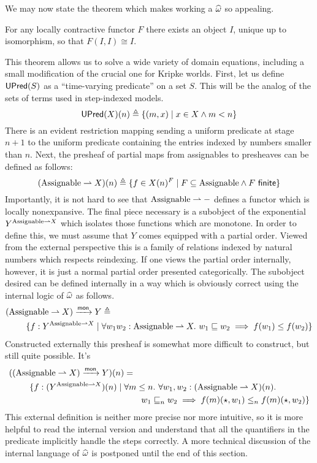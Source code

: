 We may now state the theorem which makes working a
$\widehat{\omega}$ so appealing.
\begin{thm}\label{thm:steps:fixed-points}
  For any locally contractive functor $F$ there exists an object $I$,
  unique up to isomorphism, so that $F(I, I) \cong I$.
\end{thm}
This theorem allows us to solve a wide variety of domain equations,
including a small modification of the crucial one for Kripke
worlds. First, let us define $\mathsf{UPred}(S)$ as a ``time-varying
predicate'' on a set $S$. This will be the analog of the sets of terms
used in step-indexed models.
\[
  \mathsf{UPred}(X)(n) \triangleq \{(m, x) \mid x \in X \land m < n\}
\]
There is an evident restriction mapping sending a uniform predicate at
stage $n + 1$ to the uniform predicate containing the entries indexed
by numbers smaller than $n$. Next, the presheaf of partial maps from
assignables to presheaves can be defined as follows:
\[
  (\assignables \pto X)(n) \triangleq
  \{f \in X(n)^{F} \mid F \subseteq \assignables \land F\ \mathsf{finite}\}
\]
Importantly, it is not hard to see that $\mathrm{Assignable} \rightharpoonup -$ defines
a functor which is locally nonexpansive. The final piece necessary is
a subobject of the exponential $Y^{\mathrm{Assignable} \rightharpoonup X}$ which
isolates those functions which are monotone. In order to define this,
we must assume that $Y$ comes equipped with a partial order. Viewed
from the external perspective this is a family of relations indexed by
natural numbers which respects reindexing. If one views the partial
order internally, however, it is just a normal partial order presented
categorically. The subobject desired can be defined internally in a
way which is obviously correct using the internal logic of
$\widehat{\omega}$ as follows.
\begin{align*}
  (\mathrm{Assignable} \rightharpoonup X) \xrightarrow{\mathsf{mon}} Y &\triangleq \\
  \{f : Y^{\mathrm{Assignable} \rightharpoonup X} \mid{}&
   \forall w_1 w_2 : \mathrm{Assignable} \rightharpoonup X.\ w_1 \mathrel{\sqsubseteq} w_2 \implies f(w_1) \le f(w_2)\}
\end{align*}
Constructed externally this presheaf is somewhat more difficult to
construct, but still quite possible. It's
\begin{align*}
  ((\mathrm{Assignable} \rightharpoonup X) \xrightarrow{\mathsf{mon}} Y)(n) &= \\
  \{f : (Y^{\mathrm{Assignable} \rightharpoonup X})(n) \mid{}&
   \forall m \le n.\ \forall w_1, w_2 : (\mathrm{Assignable} \rightharpoonup X)(n).\\
  &\qquad w_1 \mathrel{\sqsubseteq}_n w_2 \implies f(m)(\star, w_1) \le_n f(m)(\star, w_2)\}
\end{align*}
This external definition is neither more precise nor more intuitive,
so it is more helpful to read the internal version and understand that
all the quantifiers in the predicate implicitly handle the steps
correctly. A more technical discussion of the internal language of
$\widehat{\omega}$ is postponed until the end of this section.

